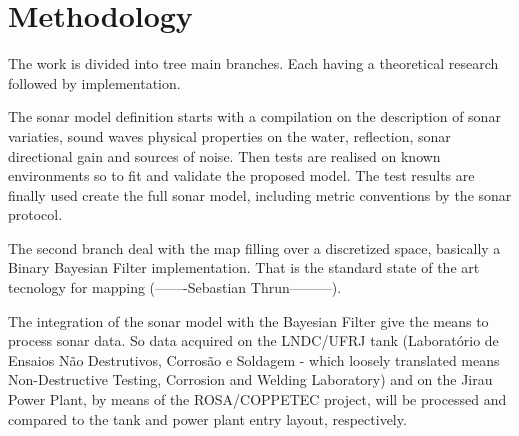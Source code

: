 

\section{Methodology}
 


% 


The work is divided into tree main branches. Each having a theoretical research
followed by implementation.

The sonar model definition starts with a compilation on the description of sonar
variaties, sound waves physical properties on the water, reflection, sonar
directional gain and sources of noise. Then tests are realised on known
environments so to fit and validate the proposed model. The test results are
finally used create the full sonar model, including metric conventions by the
sonar protocol.

The second branch deal with the map filling over a discretized space, basically
a Binary Bayesian Filter implementation. That is the standard state of the art
tecnology for mapping (-------Sebastian Thrun---------).



The integration of the sonar model with the Bayesian Filter give the means to
process sonar data. So data acquired on the LNDC/UFRJ tank (Laboratório de
Ensaios Não Destrutivos, Corrosão e Soldagem - which loosely translated means
Non-Destructive Testing, Corrosion and Welding Laboratory) and on the Jirau
Power Plant, by means of the ROSA/COPPETEC project, will be processed and
compared to the tank and power plant entry layout, respectively.
 

